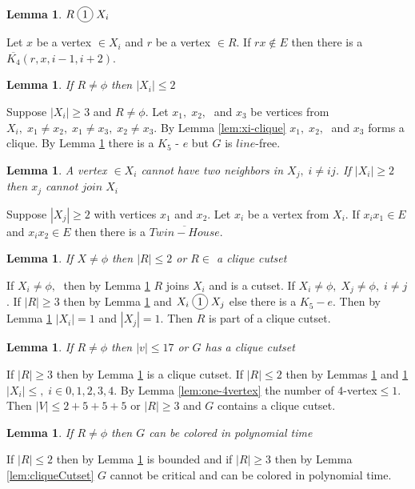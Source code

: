 \documentclass[12pt]{article}
\newcommand*\circled[1]{\tikz[baseline=(char.base)]{
            \node[shape=circle,draw,inner sep=2pt] (char) {#1};}}
\newtheorem{Lemma}[Theorem]{Lemma}
\begin{document}
\begin{Lemma}\label{lem:r-join-xi}
$R \; \circled{1} \; X_i$
\end{Lemma}
 Let $x$ be a vertex $\in X_i$ and $r$ be a vertex $\in R$. If $rx \not \in E$ then there is a $\overline{K_4} (r, x, i-1, i+2)$.

\begin{Lemma}\label{lem:r-limits-xi}
If $R \neq \phi$ then $|X_i| \leq 2$
\end{Lemma}
 Suppose $|X_i| \geq 3$ and $R \neq \phi$. Let $x_1,\; x_2,\;$ and $x_3$ be vertices from $X_i,\; x_1 \neq x_2,\; x_1 \neq x_3,\; x_2 \neq x_3$. By Lemma \ref{lem:xi-clique} $x_1,\; x_2,\;$ and $x_3$ forms a clique. By Lemma \ref{lem:r-join-xi} there is a $K_5$ - $e$ but $G$ is $line$-free.

\begin{Lemma}\label{lem:2xi-cojoins-xj}
A vertex $\in X_i$ cannot have two neighbors in $X_j,\; i \neq ij$.
If $|X_i| \geq 2$ then $x_j$ cannot $ join \; X_i$
\end{Lemma}
 Suppose $|X_j| \geq 2$ with vertices $x_1$ and $x_2$. Let $x_i$ be a vertex from $X_{i}$. If $x_ix_1 \in E$ and $x_ix_2 \in E$ then there is a $\overline{Twin-House}$.

\begin{Lemma}\label{lem:xi-limits-r}
If $X \neq \phi$ then $|R| \leq 2$ or $R \in$ a clique cutset 
\end{Lemma}
 If $X_i \neq \phi,\;$ then by Lemma \ref{lem:r-join-xi} $R$ joins $X_i$ and is a cutset. If $X_i \neq \phi,\; X_j \neq \phi,\; i \neq j$. If $|R| \geq 3$ then by Lemma \ref{lem:r-join-xi} and $X_i \; \circled{1} \; X_j$ else there is a $K_5 - e$. Then by Lemma \ref{lem:2xi-cojoins-xj} $|X_i| = 1$ and $|X_j| = 1$. Then $R$ is part of a clique cutset.

\begin{Lemma}\label{lem:r-bounded}
If $R \neq \phi$ then $ |v| \leq 17$ or $G$ has a clique cutset
\end{Lemma}
 If $|R| \geq 3$ then by Lemma \ref{lem:xi-limits-r} is a clique cutset. If $|R| \leq 2$ then by Lemmas \ref{lem:r-limits-xi} and \ref{lem:2xi-cojoins-xj} $|X_i| \leq,\; i \in {0,1,2,3,4}$. By Lemma \ref{lem:one-4vertex} the number of $4$-vertex$ \leq 1$. Then $|V| \leq 2 + 5 + 5 + 5$ or $|R| \geq 3$ and $G$ contains a clique cutset.

\begin{Lemma}\label{lem:r-polynomial}
If $R \neq \phi$ then $G$ can be colored in polynomial time
\end{Lemma}
 If $|R| \leq 2$ then by Lemma \ref{lem:r-bounded} is bounded and if $|R| \geq 3$ then by Lemma \ref{lem:cliqueCutset} $G$ cannot be critical and can be colored in polynomial time.
\end{document}
